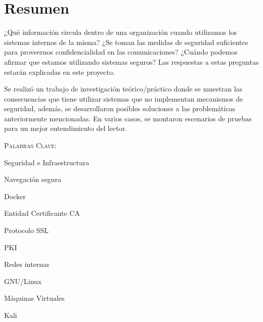 \thispagestyle{empty}
\chapter*{Resumen}


\bigskip

¿Qué información circula dentro de una organización cuando utilizamos los sistemas internos 
de la misma?
¿Se toman las medidas de seguridad suficientes para proveernos confidencialidad en las 
comunicaciones? ¿Cuándo podemos afirmar que estamos 
utilizando sistemas seguros? Las respuestas a estas preguntas estarán explicadas en este
proyecto.

Se realizó un trabajo de investigación teórico/práctico donde se muestran las consecuencias
que tiene utilizar sistemas que no implementan mecanismos de seguridad, además, 
se desarrollaron posibles soluciones a las problemáticas anteriormente mencionadas. En varios 
casos, se montaron escenarios de pruebas para un mejor entendimiento del lector.


\bigskip
\noindent \textsc{Palabras Clave:} \par

Seguridad e Infraestructura\par
Navegación segura \par
Docker \par
Entidad Certificante CA \par
Protocolo SSL \par
PKI \par
Redes internas \par
GNU/Linux \par
Máquinas Virtuales  \par
Kali \par


